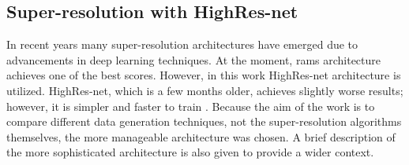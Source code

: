 \subsection{Super-resolution with HighRes-net}
\label{sec:sr-highresnet}
In recent years many super-resolution architectures have emerged due to advancements in deep learning techniques.
At the moment, \gls{rams} architecture achieves one of the best scores.
However, in this work HighRes-net architecture is utilized.
HighRes-net, which is a few months older, achieves slightly worse results; however, it is simpler and faster to train \cite{paperswithcode-ranking}.
Because the aim of the work is to compare different data generation techniques, not the super-resolution algorithms themselves, the more manageable architecture was chosen.
A brief description of the more sophisticated architecture is also given to provide a wider context.

